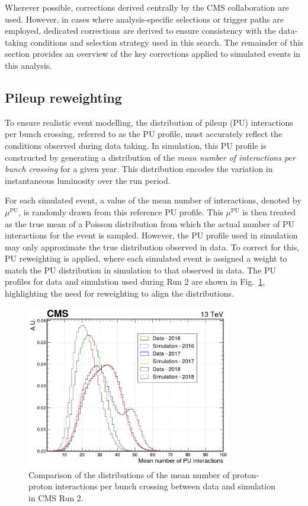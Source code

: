 Wherever possible, corrections derived centrally by the CMS collaboration are used. However, in cases where analysis-specific selections or trigger paths are employed, dedicated corrections are derived to ensure consistency with the data-taking conditions and selection strategy used in this search. The remainder of this section provides an overview of the key corrections applied to simulated events in this analysis.

\subsection{Pileup reweighting}

To ensure realistic event modelling, the distribution of pileup (PU) interactions per bunch crossing, referred to as the PU profile, must accurately reflect the conditions observed during data taking. In simulation, this PU profile is constructed by generating a distribution of the \textit{mean number of interactions per bunch crossing} for a given year. This distribution encodes the variation in instantaneous luminosity over the run period.

For each simulated event, a value of the mean number of interactions, denoted by $\mu^{\text{PU}}$, is randomly drawn from this reference PU profile. This $\mu^{\text{PU}}$ is then treated as the true mean of a Poisson distribution from which the actual number of PU interactions for the event is sampled. However, the PU profile used in simulation may only approximate the true distribution observed in data. To correct for this, PU reweighting is applied, where each simulated event is assigned a weight to match the PU distribution in simulation to that observed in data. The PU profiles for data and simulation used during Run 2 are shown in Fig.~\ref{Figure:Chapter6_PU_Profiles}, highlighting the need for reweighting to align the distributions.

\begin{figure}[h]
\centering
\includegraphics[width=0.8\textwidth]{Figures/Chapter6/PU_Profile.pdf}
\caption{Comparison of the distributions of the mean number of proton-proton interactions per bunch crossing between data and simulation in CMS Run 2.}
\label{Figure:Chapter6_PU_Profiles}
\end{figure}

